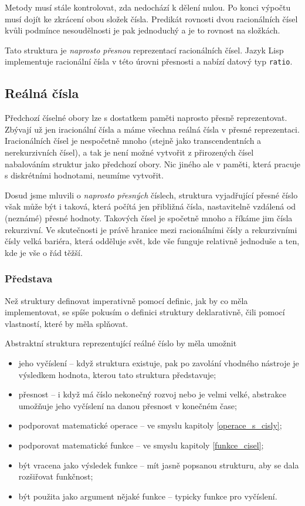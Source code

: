 Metody musí stále kontrolovat, zda nedochází k dělení nulou. Po konci výpočtu musí dojít ke zkrácení obou složek čísla. Predikát rovnosti dvou racionálních čísel kvůli podmínce nesoudělnosti je pak jednoduchý a je to rovnost na složkách.

Tato struktura je \textit{naprosto přesnou} reprezentací racionálních čísel. Jazyk Lisp implementuje racionální čísla v této úrovni přesnosti a nabízí datový typ \texttt{ratio}.

\subsection{Reálná čísla}
Předchozí číselné obory lze s dostatkem paměti naprosto přesně reprezentovat. Zbývají už jen iracionální čísla a máme všechna reálná čísla v přesné reprezentaci. Iracionálních čísel je nespočetně mnoho (stejně jako transcendentních a nerekurzivních čísel), a tak je není možné vytvořit z přirozených čísel nabalováním struktur jako předchozí obory. Nic jiného ale v paměti, která pracuje s diskrétními hodnotami, neumíme vytvořit.

Dosud jsme mluvili o \textit{naprosto přesných} číslech, struktura vyjadřující přesné číslo však může být i taková, která počítá jen přibližná čísla, nastavitelně vzdálená od (neznámé) přesné hodnoty. Takových čísel je spočetně mnoho a říkáme jim čísla rekurzivní. Ve skutečnosti je právě hranice mezi racionálními čísly a rekurzivními čísly velká bariéra, která odděluje svět, kde vše funguje relativně jednoduše a ten, kde je vše o řád těžší.

\subsubsection{Představa}\label{kap:predstava}
Než struktury definovat imperativně pomocí definic, jak by co měla implementovat, se spíše pokusím o definici struktury deklarativně, čili pomocí vlastností, které by měla splňovat.

Abstraktní struktura reprezentující reálné číslo by měla umožnit
\begin{itemize}
\item{jeho vyčíslení -- když struktura existuje, pak po zavolání vhodného nástroje je výsledkem hodnota, kterou tato struktura představuje;}
\item{přesnost -- i když má číslo nekonečný rozvoj nebo je velmi velké, abstrakce umožňuje jeho vyčíslení na danou přesnost v konečném čase;}
\item{podporovat matematické operace -- ve smyslu kapitoly \ref{operace_s_cisly};}
\item{podporovat matematické funkce -- ve smyslu kapitoly \ref{funkce_cisel};}
\item{být vracena jako výsledek funkce -- mít jasně popsanou strukturu, aby se dala rozšiřovat funkčnost;}
\item{být použita jako argument nějaké funkce -- typicky funkce pro vyčíslení.}
\end{itemize}

